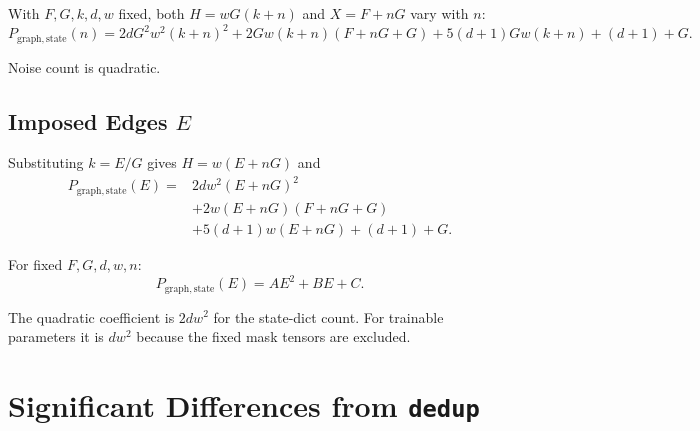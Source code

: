 \documentclass[11pt]{article}
\begin{document}
With $F,G,k,d,w$ fixed, both $H=wG(k+n)$ and $X=F+nG$ vary with $n$:
\begin{equation}
\boxed{
P_{\mathrm{graph,state}}(n)
=2dG^2w^2(k+n)^2
+2Gw(k+n)(F+nG+G)
+5(d+1)Gw(k+n)
+(d+1)+G.
}
\end{equation}

Noise count is quadratic.

\subsection{Imposed Edges $E$}

Substituting $k=E/G$ gives $H=w(E+nG)$ and
\begin{equation}
\boxed{
\begin{aligned}
P_{\mathrm{graph,state}}(E)={}&2d w^2(E+nG)^2\\
&+2w(E+nG)(F+nG+G)\\
&+5(d+1)w(E+nG)+(d+1)+G.
\end{aligned}
}
\end{equation}

For fixed $F,G,d,w,n$:
\begin{equation}
\boxed{P_{\mathrm{graph,state}}(E)=AE^2+BE+C.}
\end{equation}

The quadratic coefficient is $2dw^2$ for the state-dict count. For trainable parameters it is
$dw^2$ because the fixed mask tensors are excluded.

\section{Significant Differences from \texttt{dedup}}
\end{document}
